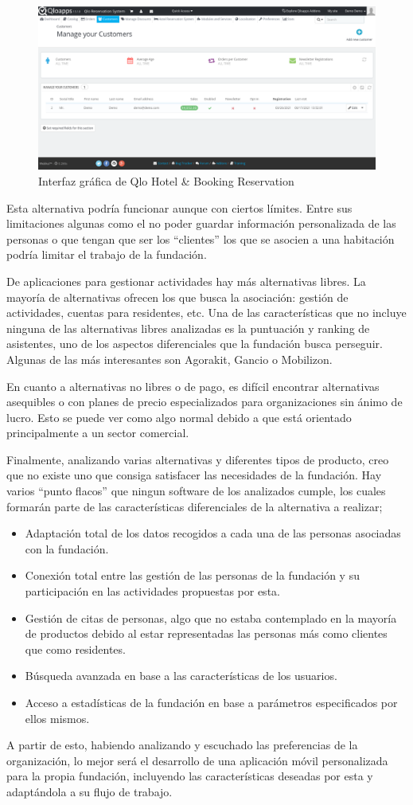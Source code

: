 \begin{figure}[htbp]
    \centerline{\includegraphics[scale=.5]{imagenes/estado_arte/qlo.png}}
    \caption{Interfaz gráfica de Qlo Hotel \& Booking Reservation}
    \label{fig}
\end{figure}

Esta alternativa podría funcionar aunque con ciertos límites. Entre sus limitaciones algunas como el no poder guardar información personalizada de las personas o que tengan que ser los ``clientes'' los que se asocien a una habitación podría limitar el trabajo de la fundación.

De aplicaciones para gestionar actividades hay más alternativas libres. La mayoría de alternativas ofrecen los que busca la asociación: gestión de actividades, cuentas para residentes, etc. Una de las características que no incluye ninguna de las alternativas libres analizadas es la puntuación y ranking de asistentes, uno de los aspectos diferenciales que la fundación busca perseguir. Algunas de las más interesantes son Agorakit, Gancio o Mobilizon.

En cuanto a alternativas no libres o de pago, es difícil encontrar alternativas asequibles o con planes de precio especializados para organizaciones sin ánimo de lucro. Esto se puede ver como algo normal debido a que está orientado principalmente a un sector comercial.

Finalmente, analizando varias alternativas y diferentes tipos de producto, creo que no existe uno que consiga satisfacer las necesidades de la fundación. Hay varios ``punto flacos'' que ningun software de los analizados cumple, los cuales formarán parte de las características diferenciales de la alternativa a realizar;

\begin{itemize}
    \item Adaptación total de los datos recogidos a cada una de las personas asociadas con la fundación.
    \item Conexión total entre las gestión de las personas de la fundación y su participación en las actividades propuestas por esta.
    \item Gestión de citas de personas, algo que no estaba contemplado en la mayoría de productos debido al estar representadas las personas más como clientes que como residentes.
    \item Búsqueda avanzada en base a las características de los usuarios.
    \item Acceso a estadísticas de la fundación en base a parámetros especificados por ellos mismos.
\end{itemize}

A partir de esto, habiendo analizando y escuchado las preferencias de la organización, lo mejor será el desarrollo de una aplicación móvil personalizada para la propia fundación, incluyendo las características deseadas por esta y adaptándola a su flujo de trabajo.